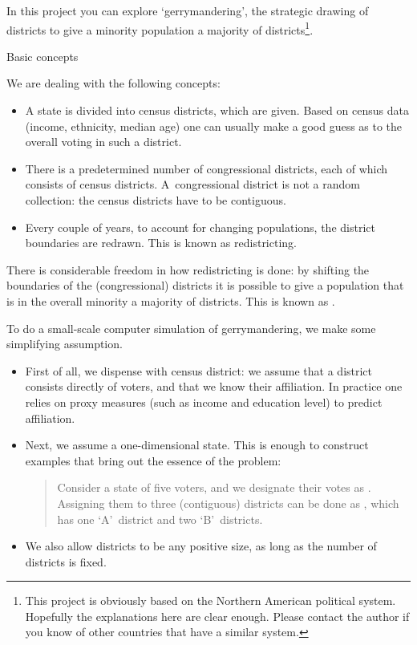 
In this project you can explore `gerrymandering', the strategic drawing
of districts to give a minority population a majority of
districts\footnote{This project is obviously based on the Northern
  American political system. Hopefully the explanations here are clear
  enough. Please contact the author if you know of other countries
  that have a similar system.}.

 {Basic concepts}

We are dealing with the following concepts:
\begin{itemize}
\item A state is divided into census districts, which are given. Based
  on census data (income, ethnicity, median age) one can
  usually make a good guess as to the overall voting in such a
  district. 
\item There is a predetermined number of congressional districts, each
  of which 
  consists of census districts. A~congressional district is not a
  random collection: the census districts have to be contiguous.
\item Every couple of years, to account for changing populations, the
  district boundaries are redrawn. This is known as redistricting.
\end{itemize}
There is considerable freedom in how redistricting is done: by shifting the
boundaries of the (congressional) districts it is possible to give a
population that is in the overall minority a majority of districts. This is
known as .



To do a small-scale computer simulation of gerrymandering, we make
some simplifying assumption.
\begin{itemize}
\item First of all, we dispense with census district: we assume that a
  district consists directly of voters, and that we know their
  affiliation. In practice one relies on proxy measures (such as
  income and education level) to predict affiliation.
\item Next, we assume a one-dimensional state. This is enough to
  construct examples that bring out the essence of the problem:
\begin{quotation}
  \noindent
  Consider a state of five voters, and we designate their votes as
  . Assigning them to three (contiguous) districts can be
  done as , which has one `A'~district and two
  `B'~districts.
\end{quotation}
\item We also allow districts to be any positive size, as long as the
  number of districts is fixed.
\end{itemize}

